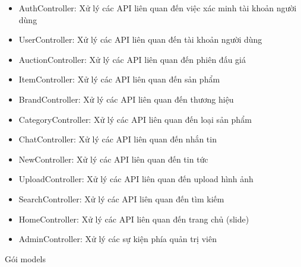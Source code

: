 \documentclass{article}
\begin{document}
\begin{itemize}
    \item AuthController: Xử lý các API liên quan đến việc xác minh tài khoản người dùng
    \item UserController: Xử lý các API liên quan đến tài khoản người dùng 
    \item AuctionController: Xử lý các API liên quan đến phiên đấu giá
    \item ItemController: Xử lý các API liên quan đến sản phẩm
    \item BrandController: Xử lý các API liên quan đến thương hiệu
    \item CategoryController: Xử lý các API liên quan đến loại sản phẩm
    \item ChatController: Xử lý các API liên quan đến nhắn tin
    \item NewController: Xử lý các API liên quan đến tin tức
    \item UploadController: Xử lý các API liên quan đến upload hình ảnh
    \item SearchController: Xử lý các API liên quan đến tìm kiếm
    \item HomeController: Xử lý các API liên quan đến trang chủ (slide)
    \item AdminController: Xử lý các sự kiện phía quản trị viên
\end{itemize}
Gói models
\end{document}
